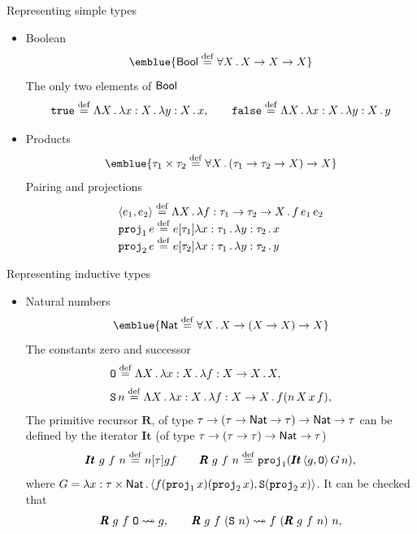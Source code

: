 \documentclass[paper=screen,mode=present,style=zysimple]{powerdot}
\begin{document}
\begin{slide}{Representing simple types}
\begin{itemize}
\item Boolean 
\[
\emblue{\tbool \defeq \forall X \ldot X \to X \to X}
\]
The only two elements of $\mathsf{Bool}$ 
\[
\mathtt{true} \stackrel{\mathrm{def}}{=} \Lambda X \, . \, \lambda x : X \, . \, \lambda y : X \, . \, x , 
\qquad
\mathtt{false} \stackrel{\mathrm{def}}{=} \Lambda X \, . \, \lambda x : X \, . \, \lambda y : X \, . \, y 
\]
\item Products
\[
\emblue{\tau_1 \times \tau_2 \defeq \forall X \ldot (\tau_1 \to \tau_2 \to X) \to X}
\]
Pairing and projections
\[
\begin{array}{l}
\langle{e_1, e_2}\rangle \stackrel{\mathrm{def}}{=} \Lambda X \, . \, \lambda f : \tau_1 \to \tau_2 \to X \, . \, f \, e_1 \, e_2
\\
\mathtt{proj}_1 \, e \stackrel{\mathrm{def}}{=} e [\tau_1] \lambda x : \tau_1 \, . \, \lambda y : \tau_2 \, . \, x
\\
\mathtt{proj}_2 \, e \stackrel{\mathrm{def}}{=} e [\tau_2] \lambda x : \tau_1 \, . \, \lambda y : \tau_2 \, . \, y
\end{array}
\]
\end{itemize}
\end{slide}

\begin{slide}{Representing inductive types}
\begin{itemize}
\item Natural numbers
\[
\emblue{\tnat \defeq \forall X \ldot X \to (X \to X) \to X}
\]
The constants zero and successor
\[
\begin{array}{l}
\mathtt{O} \stackrel{\mathrm{def}}{=} \Lambda X \, . \, \lambda x : X \, . \, \lambda f : X \to X \, . \, X , 
\\[0.5em]
\mathtt{S} \, n \stackrel{\mathrm{def}}{=} \Lambda X \, . \, \lambda x : X \, . \, \lambda f : X \to X \, . \, f (n \, X \, x \, f), 
\end{array}
\]
The primitive recursor $\pmb{R}$, of type $\tau \to (\tau \to \mathsf{Nat} \to \tau) \to \mathsf{Nat} \to \tau$ 
can be defined by the iterator $\pmb{It}$ (of type $\tau \to (\tau \to \tau) \to \mathsf{Nat} \to \tau$)
\[
\pmb{It} \ g \ f \ n \stackrel{\mathrm{def}}{=} n [\tau] g f 
\qquad
\pmb{R} \ g \ f \ n \stackrel{\mathrm{def}}{=} \mathtt{proj}_1 (\pmb{It} \, \langle{g, \mathtt{O}}\rangle \, G \, n) ,
\]
where $G = \lambda x : \tau \times \mathsf{Nat} \, . \, \langle{f (\mathtt{proj}_1\, x) (\mathtt{proj}_2 \, x), \mathtt{S}(\mathtt{proj}_2 \, x)}\rangle$.
It can be checked that 
\[
\pmb{R} \ g \ f \ \czero \reduceto g , 
\qquad
\pmb{R} \ g \ f \ (\csucc \ n) \reduceto f \ (\pmb{R} \ g \  f  \ n) \ n, 
\]
\end{itemize}
\end{slide}
\end{document}
